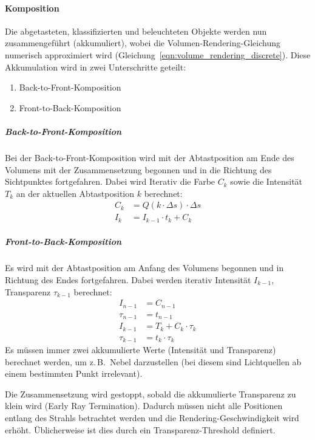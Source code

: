\documentclass[a4paper, 11pt, accentcolor = tud3b]{tudreport}
\newcommand{\zB}{z.\,B.~}
\begin{document}
				\paragraph{Komposition}
					Die abgetasteten, klassifizierten und beleuchteten Objekte werden nun zusammengeführt (akkumuliert), wobei die Volumen-Rendering-Gleichung numerisch approximiert wird (Gleichung~\ref{eqn:volume_rendering_discrete}). Diese Akkumulation wird in zwei Unterschritte geteilt:
					\begin{enumerate}
						\item Back-to-Front-Komposition
						\item Front-to-Back-Komposition
					\end{enumerate}
	
					\subparagraph{Back-to-Front-Komposition}
						Bei der Back-to-Front-Komposition wird mit der Abtastposition am Ende des Volumens mit der Zusammensetzung begonnen und in die Richtung des Sichtpunktes fortgefahren. Dabei wird Iterativ die Farbe \( C_k \) sowie die Intensität \( T_k \) an der aktuellen Abtastposition \( k \) berechnet:
						\begin{align*}
							C_k &= Q(k \cdot \Delta s) \cdot \Delta s \\
							I_k &= I_{k - 1} \cdot t_k + C_k
						\end{align*}
	
					\subparagraph{Front-to-Back-Komposition}
						Es wird mit der Abtastposition am Anfang des Volumens begonnen und in Richtung des Endes fortgefahren. Dabei werden iterativ Intensität \( I_{k - 1} \), Transparenz \( \tau_{k - 1} \) berechnet:
						\begin{align*}
							I_{n - 1} &= C_{n - 1} \\
							\tau_{n - 1} &= t_{n - 1} \\
							I_{k - 1} &= T_k + C_k \cdot \tau_k \\
							\tau_{k - 1} &= t_k \cdot \tau_k
						\end{align*}
						Es müssen immer zwei akkumulierte Werte (Intensität und Transparenz) berechnet werden, um \zB Nebel darzustellen (bei diesem sind Lichtquellen ab einem bestimmten Punkt irrelevant).
						
						Die Zusammensetzung wird gestoppt, sobald die akkumulierte Transparenz zu klein wird (Early Ray Termination). Dadurch müssen nicht alle Positionen entlang des Strahls betrachtet werden und die Rendering-Geschwindigkeit wird erhöht. Üblicherweise ist dies durch ein Transparenz-Threshold definiert.
	
\end{document}
